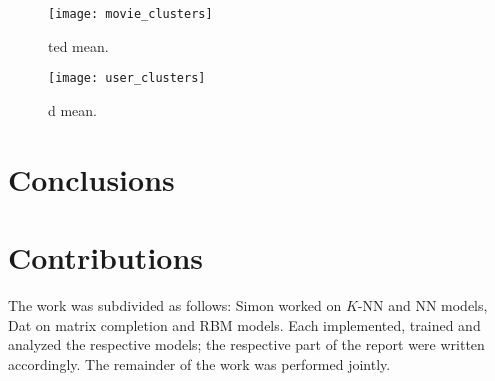 \documentclass[bj, preprint]{imsart}
\begin{document}
\begin{figure}
	\texttt{[image: movie\_clusters]}
	\caption{ted mean.\label{fig:explore.cluster.movies}}
\end{figure}


\begin{figure}
	\texttt{[image: user\_clusters]}
	\caption{d mean.\label{fig:explore.cluster.users}}
\end{figure}


\section{Conclusions}\label{sec:conc}

%

\section{Contributions}\label{sec:contrib}

The work was subdivided as follows: Simon worked on $K$-NN and NN models, Dat on matrix completion and RBM models. Each implemented, trained and analyzed the respective models; the respective part of the report were written accordingly. The remainder of the work was performed jointly.

\newpage

{}
\end{document}
